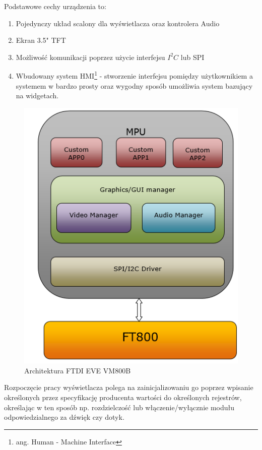 \documentclass{xmgr}
\begin{document}
Podstawowe cechy urządzenia to\cite{FTDI}:
\begin{enumerate}
	\item Pojedynczy układ scalony dla wyświetlacza oraz kontrolera Audio
	\item Ekran 3.5" TFT
	\item Możliwość komunikacji poprzez użycie interfejsu $I^2C$ lub SPI
	\item Wbudowany system HMI\footnote{ang. Human - Machine Interface} - stworzenie interfejsu pomiędzy użytkownikiem a systemem w bardzo prosty oraz wygodny sposób umożliwia system bazujący na widgetach.
\end{enumerate}

\begin{figure}[!h]
    \centering
    \includegraphics[height=0.25\textheight]{images/FTDIarchitecture.png}
    \caption{Architektura FTDI EVE VM800B}
\end{figure}

Rozpoczęcie pracy wyświetlacza polega na zainicjalizowaniu go poprzez wpisanie określonych przez specyfikację producenta wartości do określonych rejestrów, określając w ten sposób np. rozdzielczość lub włączenie/wyłącznie modułu odpowiedzialnego za dźwięk czy dotyk. 
\end{document}
